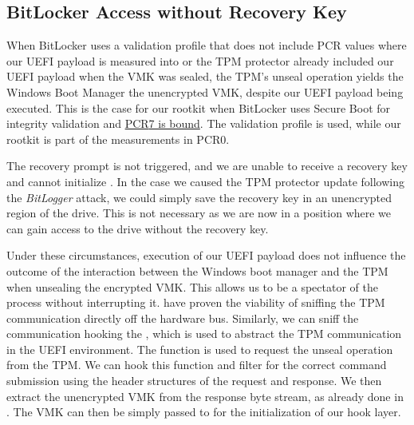 \subsection{BitLocker Access without Recovery Key}
\label{sec:attacks:bitlocker:bitlocker-access-without-recovery-key}

When BitLocker uses a validation profile that does not include \ac{PCR} values where our \ac{UEFI} payload is measured into or the \ac{TPM} protector already included our \ac{UEFI} payload when the \ac{VMK} was sealed, the \ac{TPM}'s unseal operation yields the Windows Boot Manager the unencrypted \ac{VMK}, despite our \ac{UEFI} payload being executed.
This is the case for our rootkit when BitLocker uses Secure Boot for integrity validation and \hyperlink{pcr7-binding}{\ac{PCR}7 is bound}.
The validation profile \hyperref[tab:pcr-usage]{} is used, while our rootkit is part of the measurements in \ac{PCR}0.

The recovery prompt is not triggered, and we are unable to receive a recovery key and cannot initialize .
In the case we caused the \ac{TPM} protector update following the \emph{BitLogger} attack, we could simply save the recovery key in an unencrypted region of the drive.
This is not necessary as we are now in a position where we can gain access to the drive without the recovery key.

Under these circumstances, execution of our \ac{UEFI} payload does not influence the outcome of the interaction between the Windows boot manager and the \ac{TPM} when unsealing the encrypted \ac{VMK}.
This allows us to be a spectator of the process without interrupting it.
\cite{tpm-spi-sniffing, tpm-lpc-sniffing} have proven the viability of sniffing the \ac{TPM} communication directly off the hardware bus.
Similarly, we can sniff the communication hooking the , which is used to abstract the \ac{TPM} communication in the \ac{UEFI} environment.
The  function is used to request the unseal operation from the \ac{TPM}.
We can hook this function and filter for the correct command submission using the header structures of the request and response.
We then extract the unencrypted \ac{VMK} from the response byte stream, as already done in \cite{tpm-lpc-sniffing}.
The \ac{VMK} can then be simply passed to  for the initialization of our hook layer.